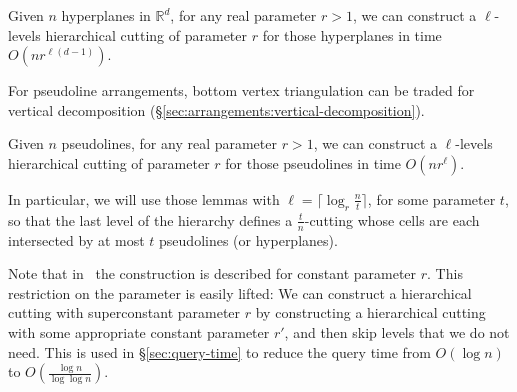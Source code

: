 \begin{lemma}\label{lem:hierarchical-cutting-d}
Given \(n\) hyperplanes in \(\mathbb{R}^d\), for any real parameter \(r >
1\), we can construct a \(\ell\)-levels hierarchical cutting of parameter
\(r\) for those hyperplanes in time \(O(nr^{\ell(d-1)})\).
\end{lemma}

For pseudoline arrangements, bottom vertex triangulation can be traded for
vertical decomposition
(\S\ref{sec:arrangements:vertical-decomposition}).
\begin{lemma}\label{lem:hierarchical-cutting-2}
Given \(n\) pseudolines, for any real parameter \(r > 1\), we can construct
a \(\ell\)-levels hierarchical cutting of parameter
\(r\) for those pseudolines in time \(O(nr^\ell)\).
\end{lemma}

In particular, we will use those lemmas with
\(\ell = \lceil \log_r \frac nt \rceil\),
for some parameter \(t\),
so that the last level of the hierarchy defines a \(\frac
tn\)-cutting whose cells are each intersected by at most \(t\) pseudolines (or
hyperplanes).

Note that in~\cite{C93} the construction is described for constant
parameter \(r\).
This restriction on the parameter is easily lifted:
We can construct a hierarchical
cutting with superconstant parameter \(r\) by constructing a hierarchical
cutting with some appropriate constant parameter \(r'\), and then skip levels that we do
not need. This is used in \S\ref{sec:query-time} to reduce the query time
from \(O(\log n)\) to \(O(\frac{\log n}{\log \log n})\).

